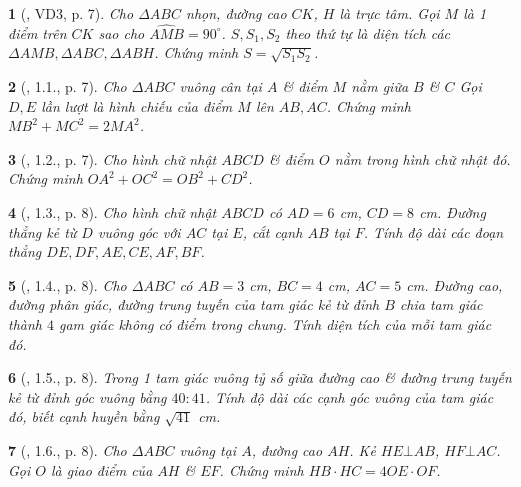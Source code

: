 \documentclass{article}
\newtheorem{baitoan}{}
\begin{document}
\begin{baitoan}[\cite{TLCT_THCS_Toan_9_hinh_hoc}, VD3, p. 7]
	Cho $\Delta ABC$ nhọn, đường cao $CK$, $H$ là trực tâm. Gọi $M$ là 1 điểm trên $CK$ sao cho $\widehat{AMB} = 90^\circ$. $S,S_1,S_2$ theo thứ tự là diện tích các $\Delta AMB,\Delta ABC,\Delta ABH$. Chứng minh $S = \sqrt{S_1S_2}$.
\end{baitoan}

\begin{baitoan}[\cite{TLCT_THCS_Toan_9_hinh_hoc}, 1.1., p. 7]
	Cho $\Delta ABC$ vuông cân tại $A$ \& điểm $M$ nằm giữa $B$ \& $C$ Gọi $D,E$ lần lượt là hình chiếu của điểm $M$ lên $AB,AC$. Chứng minh $MB^2 + MC^2 = 2MA^2$.
\end{baitoan}

\begin{baitoan}[\cite{TLCT_THCS_Toan_9_hinh_hoc}, 1.2., p. 7]
	Cho hình chữ nhật $ABCD$ \& điểm $O$ nằm trong hình chữ nhật đó. Chứng minh $OA^2 + OC^2 = OB^2 + CD^2$.
\end{baitoan}

\begin{baitoan}[\cite{TLCT_THCS_Toan_9_hinh_hoc}, 1.3., p. 8]
	Cho hình chữ nhật $ABCD$ có $AD = 6$ \emph{cm}, $CD = 8$ \emph{cm}. Đường thẳng kẻ từ $D$ vuông góc với $AC$ tại $E$, cắt cạnh $AB$ tại $F$. Tính độ dài các đoạn thẳng $DE,DF,AE,CE,AF,BF$.
\end{baitoan}

\begin{baitoan}[\cite{TLCT_THCS_Toan_9_hinh_hoc}, 1.4., p. 8]
	Cho $\Delta ABC$ có $AB = 3$  \emph{cm}, $BC = 4$ \emph{cm}, $AC = 5$ \emph{cm}. Đường cao, đường phân giác, đường trung tuyến của tam giác kẻ từ đỉnh $B$ chia tam giác thành $4$ gam giác không có điểm trong chung. Tính diện tích của mỗi tam giác đó.
\end{baitoan}

\begin{baitoan}[\cite{TLCT_THCS_Toan_9_hinh_hoc}, 1.5., p. 8]
	Trong 1 tam giác vuông tỷ số giữa đường cao \& đường trung tuyến kẻ từ đỉnh góc vuông bằng $40:41$. Tính độ dài các cạnh góc vuông của tam giác đó, biết cạnh huyền bằng $\sqrt{41}$ \emph{cm}.
\end{baitoan}

\begin{baitoan}[\cite{TLCT_THCS_Toan_9_hinh_hoc}, 1.6., p. 8]
	Cho $\Delta ABC$ vuông tại $A$, đường cao $AH$. Kẻ $HE\bot AB$, $HF\bot AC$. Gọi $O$ là giao điểm của $AH$ \& $EF$. Chứng minh $HB\cdot HC = 4OE\cdot OF$.
\end{baitoan}
\end{document}
